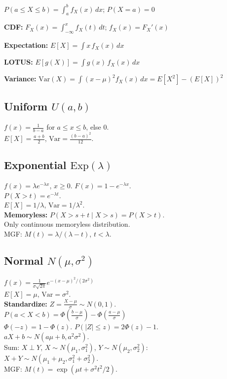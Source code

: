 \documentclass[6pt]{article}
\newcommand{\hi}[1]{\colorbox{yellow!25}{\ensuremath{#1}}}
\newcommand{\hitext}[1]{\colorbox{yellow!25}{#1}}
\begin{document}
\begin{multicols}{4}
$P(a\leq X\leq b)=\int_a^b f_X(x)\,dx$;\; $P(X=a)=0$

\textbf{CDF:} $F_X(x)=\int_{-\infty}^x f_X(t)\,dt$;\; $f_X(x)=F_X'(x)$

\textbf{Expectation:} $E[X]=\int x\,f_X(x)\,dx$

\textbf{LOTUS:} $E[g(X)]=\int g(x)\,f_X(x)\,dx$

\textbf{Variance:} $\text{Var}(X)=\int (x-\mu)^2 f_X(x)\,dx = E[X^2]-(E[X])^2$

\subsection{Uniform $U(a,b)$}
$f(x)=\frac{1}{b-a}$ for $a\leq x\leq b$, else 0.\\
$E[X]=\frac{a+b}{2}$, $\text{Var}=\frac{(b-a)^2}{12}$.

\subsection{Exponential $\text{Exp}(\lambda)$}
\hi{f(x)=\lambda e^{-\lambda x}}, $x\geq 0$. \hi{F(x)=1-e^{-\lambda x}}.\\
\hi{P(X>t)=e^{-\lambda t}}.\\
\hi{E[X]=1/\lambda}, $\text{Var}=1/\lambda^2$.\\
\hitext{\textbf{Memoryless:} $P(X>s+t\mid X>s)=P(X>t)$}.\\
Only continuous memoryless distribution.\\
MGF: $M(t)=\lambda/(\lambda-t)$, $t<\lambda$.

\subsection{Normal $N(\mu,\sigma^2)$}
$f(x)=\frac{1}{\sigma\sqrt{2\pi}}e^{-(x-\mu)^2/(2\sigma^2)}$\\
$E[X]=\mu$, $\text{Var}=\sigma^2$.\\
\hitext{\textbf{Standardize:} $Z=\frac{X-\mu}{\sigma}\sim N(0,1)$}.\\
\hi{P(a<X<b)=\Phi\!\left(\frac{b-\mu}{\sigma}\right)-\Phi\!\left(\frac{a-\mu}{\sigma}\right)}\\
$\Phi(-z)=1-\Phi(z)$. \;$P(|Z|\leq z)=2\Phi(z)-1$.\\
$aX+b\sim N(a\mu+b, a^2\sigma^2)$.\\
Sum: $X\perp Y$, $X\sim N(\mu_1,\sigma_1^2)$, $Y\sim N(\mu_2,\sigma_2^2)$:\\
$X+Y\sim N(\mu_1+\mu_2,\sigma_1^2+\sigma_2^2)$.\\
MGF: $M(t)=\exp(\mu t+\sigma^2 t^2/2)$.


\end{multicols}
\end{document}
